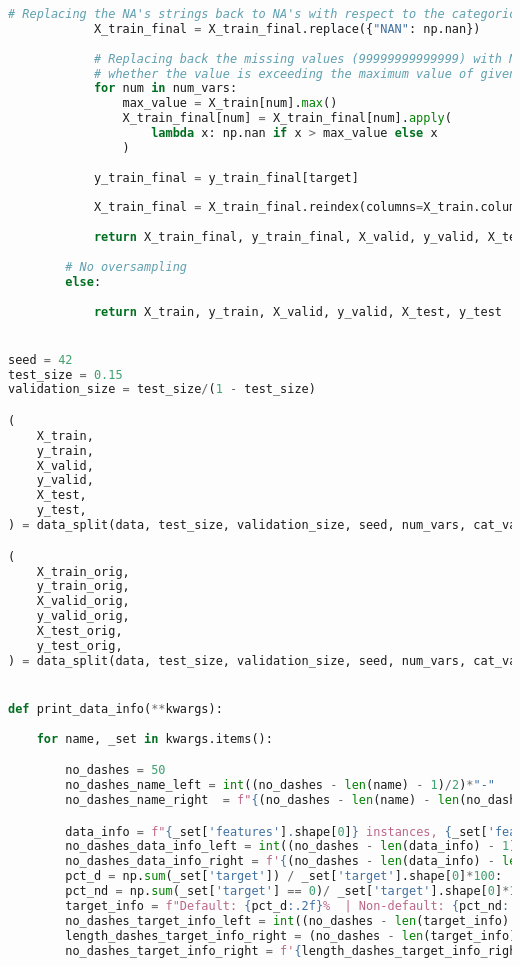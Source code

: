 \begin{lstlisting}[language=Python, basicstyle=\footnotesize\ttfamily]
			# Replacing the NA's strings back to NA's with respect to the categorical features.
			X_train_final = X_train_final.replace({"NAN": np.nan})
	
			# Replacing back the missing values (99999999999999) with NA's in such case
			# whether the value is exceeding the maximum value of given numeric feature before imputing.
			for num in num_vars:
				max_value = X_train[num].max()
				X_train_final[num] = X_train_final[num].apply(
					lambda x: np.nan if x > max_value else x
				)
	
			y_train_final = y_train_final[target]
	
			X_train_final = X_train_final.reindex(columns=X_train.columns)
	
			return X_train_final, y_train_final, X_valid, y_valid, X_test, y_test
	
		# No oversampling
		else:
	
			return X_train, y_train, X_valid, y_valid, X_test, y_test


seed = 42
test_size = 0.15
validation_size = test_size/(1 - test_size)

(
    X_train,
    y_train,
    X_valid,
    y_valid,
    X_test,
    y_test,
) = data_split(data, test_size, validation_size, seed, num_vars, cat_vars, oversampling="ADASYN")

(
    X_train_orig,
    y_train_orig,
    X_valid_orig,
    y_valid_orig,
    X_test_orig,
    y_test_orig,
) = data_split(data, test_size, validation_size, seed, num_vars, cat_vars)


def print_data_info(**kwargs):
    
    for name, _set in kwargs.items():

        no_dashes = 50
        no_dashes_name_left = int((no_dashes - len(name) - 1)/2)*"-"
        no_dashes_name_right  = f"{(no_dashes - len(name) - len(no_dashes_name_left) - 2)*'-'}"

        data_info = f"{_set['features'].shape[0]} instances, {_set['features'].shape[1]} features"
        no_dashes_data_info_left = int((no_dashes - len(data_info) - 1)/2)*"-"
        no_dashes_data_info_right = f'{(no_dashes - len(data_info) - len(no_dashes_data_info_left) - 2)*"-"}'
        pct_d = np.sum(_set['target']) / _set['target'].shape[0]*100:
        pct_nd = np.sum(_set['target'] == 0)/ _set['target'].shape[0]*100
        target_info = f"Default: {pct_d:.2f}%  | Non-default: {pct_nd:.2f}%"
        no_dashes_target_info_left = int((no_dashes - len(target_info) - 1)/2)*"-"
        length_dashes_target_info_right = (no_dashes - len(target_info) - len(no_dashes_target_info_left) - 2)
        no_dashes_target_info_right = f'{length_dashes_target_info_right*"-"}'



\end{lstlisting}
